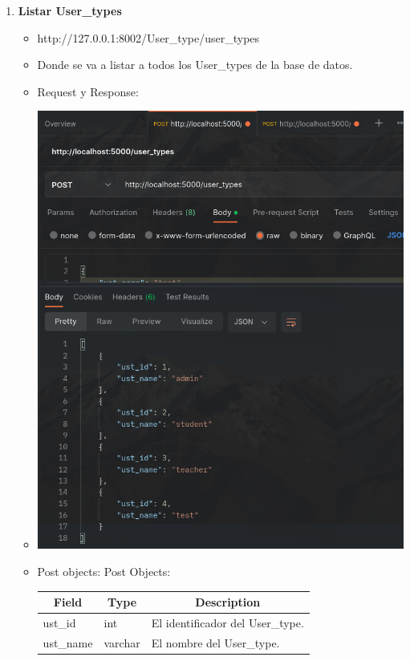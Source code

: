 \documentclass{article}
\begin{document}
\begin{enumerate}
\begin{itemize}
    \end{itemize}

    \item \textbf{Listar User\_types}
    \begin{itemize}
        \item http://127.0.0.1:8002/User\_type/user\_types
        \item Donde se va a listar a todos los User\_types de la base de
        datos.
        \item Request y Response:
        \item \includegraphics[scale=.5]{assets/user_type/user_types.png}
        \item Post objects: Post Objects: \begin{table}[H] \centering
        \begin{tabular}{|l|l|l|} \hline \multicolumn{1}{|c|}{\textbf{Field}} &
        \multicolumn{1}{c|}{\textbf{Type}} &
        \multicolumn{1}{c|}{\textbf{Description}} \\ \hline ust\_id & int & El
        identificador del User\_type. \\ \hline ust\_name & varchar & El nombre
        del User\_type. \\ \hline \end{tabular} \end{table}


\end{itemize}
\end{enumerate}
\end{document}
